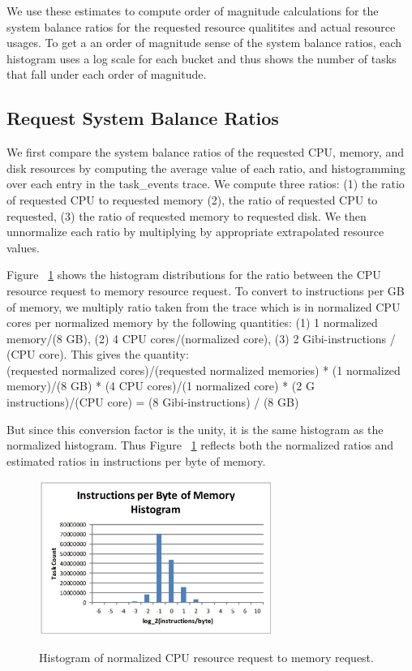 \documentclass{sig-alternate}
\begin{document}
We use these estimates to compute order of magnitude calculations for the system balance ratios for the requested resource qualitites and actual resource usages.
To get a an order of magnitude sense of the system balance ratios, each histogram uses a log scale for each bucket and thus shows the number of tasks that fall under each order of magnitude.

\subsection{Request System Balance Ratios}

We first compare the system balance ratios of the requested CPU, memory, and disk resources by computing the average value of each ratio, and histogramming over each entry in the task\_events trace.
We compute three ratios: (1) the ratio of requested CPU to requested memory (2), the ratio of requested CPU to requested, (3) the ratio of requested memory to requested disk.
We then unnormalize each ratio by multiplying by appropriate extrapolated resource values.

Figure ~\ref{req_cpu_mem} shows the histogram distributions for the ratio between the CPU resource request to memory resource request. 
To convert to instructions per GB of memory, we multiply ratio taken from the trace which is in normalized CPU cores per normalized memory by the following quantities: (1) 1 normalized memory/(8 GB), (2) 4 CPU cores/(normalized core), (3) 2 Gibi-instructions / (CPU core).  %
This gives the quantity: \\
(requested normalized cores)/(requested normalized memories) * (1 normalized memory)/(8 GB) * (4 CPU cores)/(1 normalized core) * (2 G instructions)/(CPU core) = (8 Gibi-instructions) / (8 GB)

But since this conversion factor is the unity, it is the same histogram as the normalized histogram.
Thus Figure ~\ref{req_cpu_mem} reflects both the normalized ratios and estimated ratios in instructions per byte of memory.

\begin{figure}[t]
\centering
\includegraphics[width=3in]{../figures/req_cpu_mem.jpg}
\label{req_cpu_mem}
\caption{Histogram of normalized CPU resource request to memory request.}
\end{figure}
\end{document}
